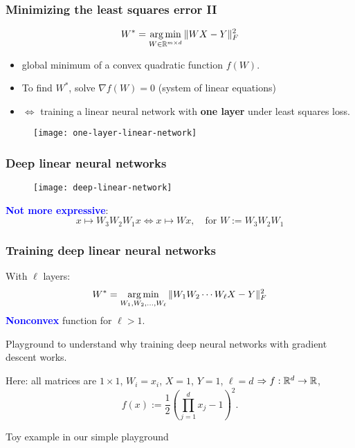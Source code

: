 \documentclass[aspectratio=149]{beamer}
\begin{document}
\begin{frame}
  \frametitle{Minimizing the least squares error II}
  \begin{equation}
    W^* = \operatorname*{arg\,min}_{W\in \mathbb{R}^{m\times d}} \Vert W X - Y \Vert_F^2
  \end{equation}
  \begin{minipage}{0.5\textwidth}
  \begin{itemize}
    \item global minimum of a convex quadratic function $f(W)$.
    \item To find $W^*$, solve $\nabla f(W)=0$ (system of linear equations)
    \item $\Leftrightarrow$ training a linear neural network with \textbf{one layer} under least squares loss.
  \end{itemize}
  \end{minipage}
  \begin{minipage}{0.45\textwidth}
    \begin{figure}[ht]
      \centering
      \texttt{[image: one-layer-linear-network]}
    \end{figure}
  \end{minipage}
\end{frame}

\begin{frame}
  \frametitle{Deep linear neural networks}
  \begin{figure}[ht]
    \centering
    \texttt{[image: deep-linear-network]}
  \end{figure}
  \textcolor{blue}{\textbf{Not more expressive}}:
  \begin{equation}
    x \mapsto W_3 W_2 W_1 x \Leftrightarrow x \mapsto Wx, \quad \text{for } W := W_3 W_2 W_1
  \end{equation}
\end{frame}


\begin{frame}
  \frametitle{Training deep linear neural networks}
  With $\ell$ layers:
  \begin{equation}
    W^* = \operatorname*{arg\,min}_{W_1, W_2, \dots,  W_\ell} \Vert W_1 W_2 \cdots W_\ell X - Y \Vert_F^2
  \end{equation}
  \textcolor{blue}{\textbf{Nonconvex}} function for $\ell > 1$.

  Playground to understand why training deep neural networks with gradient descent works.

  Here: all matrices are $1 \times 1$, $W_i = x_i$, $X=1$, $Y = 1$, $\ell = d$
  $\Rightarrow f: \mathbb{R}^d \to \mathbb{R}$,
  \begin{equation}
    f(x) := \frac12 {\left(\prod_{j=1}^d x_j - 1\right)}^2 .
  \end{equation}

  Toy example in our simple playground
\end{frame}
\end{document}
